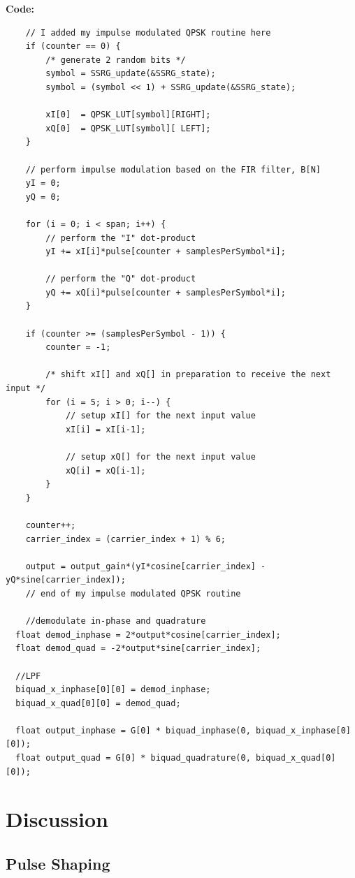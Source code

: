 \documentclass{article}
\begin{document}
\pagebreak
\textbf{Code:}

\begin{verbatim}
	// I added my impulse modulated QPSK routine here
	if (counter == 0) {
		/* generate 2 random bits */
		symbol = SSRG_update(&SSRG_state); 
		symbol = (symbol << 1) + SSRG_update(&SSRG_state);

		xI[0]  = QPSK_LUT[symbol][RIGHT];  
		xQ[0]  = QPSK_LUT[symbol][ LEFT];   
	}

	// perform impulse modulation based on the FIR filter, B[N]
	yI = 0;
	yQ = 0;

	for (i = 0; i < span; i++) {
		// perform the "I" dot-product
		yI += xI[i]*pulse[counter + samplesPerSymbol*i];	

		// perform the "Q" dot-product
		yQ += xQ[i]*pulse[counter + samplesPerSymbol*i];	
	}

	if (counter >= (samplesPerSymbol - 1)) {
		counter = -1; 

		/* shift xI[] and xQ[] in preparation to receive the next input */
		for (i = 5; i > 0; i--) {
			// setup xI[] for the next input value
			xI[i] = xI[i-1];  

			// setup xQ[] for the next input value
			xQ[i] = xQ[i-1];  
		}
	}

	counter++;
	carrier_index = (carrier_index + 1) % 6;

	output = output_gain*(yI*cosine[carrier_index] - yQ*sine[carrier_index]);
	// end of my impulse modulated QPSK routine

	//demodulate in-phase and quadrature
  float demod_inphase = 2*output*cosine[carrier_index];
  float demod_quad = -2*output*sine[carrier_index];

  //LPF
  biquad_x_inphase[0][0] = demod_inphase;
  biquad_x_quad[0][0] = demod_quad;

  float output_inphase = G[0] * biquad_inphase(0, biquad_x_inphase[0][0]);
  float output_quad = G[0] * biquad_quadrature(0, biquad_x_quad[0][0]);
\end{verbatim}


\section{Discussion}

\subsection{Pulse Shaping}
\end{document}
